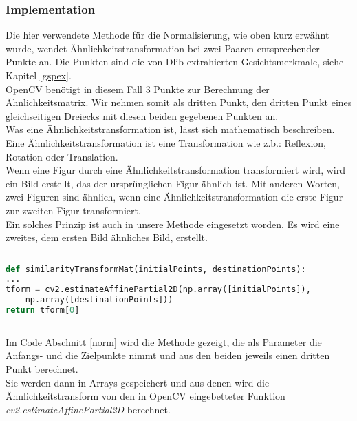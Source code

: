 	
	\subsubsection{Implementation}
	
	Die hier verwendete Methode für die Normalisierung, wie oben kurz erwähnt wurde,
	wendet
	Ähnlichkeitstransformation bei zwei Paaren entsprechender Punkte an.
	Die Punkten sind die von Dlib extrahierten Gesichtsmerkmale, siehe Kapitel
	\ref{gspex}.
	\\
	
	OpenCV benötigt in diesem Fall 3 Punkte zur Berechnung der Ähnlichkeitsmatrix.
	Wir nehmen somit als dritten Punkt, den dritten Punkt eines gleichseitigen Dreiecks
	mit diesen beiden gegebenen Punkten an.
	\\
	
	Was eine Ähnlichkeitstransformation ist, lässt sich mathematisch beschreiben. 
	Eine Ähnlichkeitstransformation ist eine Transformation wie z.b.: Reflexion,
	Rotation oder Translation. 
	\\
	
	Wenn eine Figur durch eine Ähnlichkeitstransformation transformiert wird, wird
	ein Bild erstellt, das der ursprünglichen Figur ähnlich ist. Mit anderen Worten,
	zwei Figuren sind ähnlich, wenn eine Ähnlichkeitstransformation die erste Figur
	zur zweiten Figur transformiert.\\
	
	Ein solches Prinzip ist auch in unsere Methode eingesetzt worden. Es wird eine
	zweites, dem ersten Bild ähnliches Bild, erstellt. \\
	
\begin{lstlisting}[caption=Implementation
	Normalisierung,language=python,label=norm]
	
def similarityTransformMat(initialPoints, destinationPoints):
...
tform = cv2.estimateAffinePartial2D(np.array([initialPoints]),
	np.array([destinationPoints]))
return tform[0]
	
\end{lstlisting}
	
	Im Code Abschnitt \ref{norm} wird die Methode gezeigt, die als Parameter die
	Anfangs- und die Zielpunkte nimmt und aus den beiden jeweils einen dritten Punkt
	berechnet.
	\\
	
	Sie werden dann in Arrays gespeichert und aus denen wird die
	Ähnlichkeitstransform von den in OpenCV eingebetteter Funktion
	\textit{cv2.estimateAffinePartial2D} berechnet.
	\\
	
